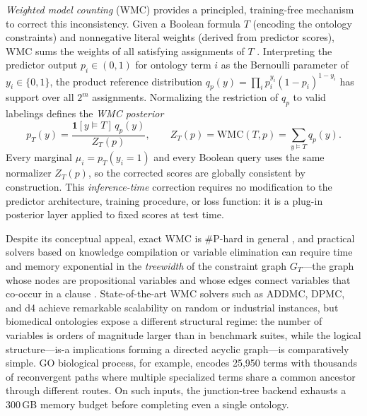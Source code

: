 \emph{Weighted model counting} (WMC) provides a principled, training-free
mechanism to correct this inconsistency. Given a Boolean formula $T$
(encoding the ontology constraints) and nonnegative literal weights
(derived from predictor scores), WMC sums the weights of all satisfying
assignments of $T$ \citep{chavira2008wmc}. Interpreting the predictor
output $p_i \in (0,1)$ for ontology term $i$ as the Bernoulli parameter
of $y_i \in \{0,1\}$, the product reference distribution
$q_p(y) = \prod_i p_i^{y_i}(1-p_i)^{1-y_i}$ has support over all $2^m$
assignments. Normalizing the restriction of $q_p$ to valid labelings
defines the \emph{WMC posterior}
\[
  p_T(y) = \frac{\mathbf{1}[y \models T]\,q_p(y)}{Z_T(p)},
  \qquad
  Z_T(p) = \mathrm{WMC}(T,p) = \sum_{y \models T} q_p(y).
\]
Every marginal $\mu_i = p_T(y_i=1)$ and every Boolean query uses the
same normalizer $Z_T(p)$, so the corrected scores are globally
consistent by construction. This \emph{inference-time} correction
requires no modification to the predictor architecture, training
procedure, or loss function: it is a plug-in posterior layer applied
to fixed scores at test time.

Despite its conceptual appeal, exact WMC is \#P-hard in general
\citep{valiant1979counting}, and practical solvers based on knowledge
compilation or variable elimination can require time and memory
exponential in the \emph{treewidth} of the constraint graph
$G_T$---the graph whose nodes are propositional variables and whose
edges connect variables that co-occur in a clause
\citep{bodlaender1993treewidth,darwiche2002kcmap,darwiche2011sdd}.
State-of-the-art WMC solvers such as ADDMC, DPMC, and d4
\citep{dudek2020addmc,dudek2020dpmc,lagniez2017improved} achieve
remarkable scalability on random or industrial instances, but biomedical
ontologies expose a different structural regime: the number of variables
is orders of magnitude larger than in benchmark suites, while the
logical structure---is-a implications forming a directed acyclic
graph---is comparatively simple. GO biological process, for example,
encodes 25,950 terms with thousands of reconvergent paths where
multiple specialized terms share a common ancestor through different
routes. On such inputs, the junction-tree backend exhausts a 300\,GB
memory budget before completing even a single ontology.

